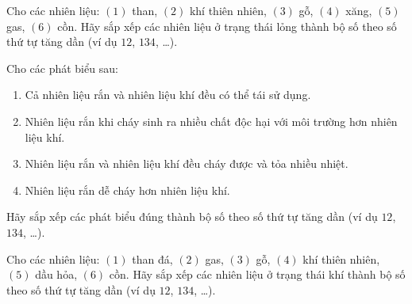 \documentclass[Main.tex]{subfiles}
\begin{document}
\begin{ex}%
	Cho các nhiên liệu: $(1)$ than, $(2)$ khí thiên nhiên, $(3)$ gỗ, $(4)$ xăng, $(5)$ gas, $(6)$ cồn. Hãy sắp xếp các nhiên liệu ở trạng thái lỏng thành bộ số theo số thứ tự tăng dần (ví dụ $12$, $134$, …).
\end{ex}

\begin{ex}%
	Cho các phát biểu sau:
	\begin{enumerate}[(1)]
		\item Cả nhiên liệu rắn và nhiên liệu khí đều có thể tái sử dụng.
		\item Nhiên liệu rắn khi cháy sinh ra nhiều chất độc hại với môi trường hơn nhiên liệu khí.
		\item Nhiên liệu rắn và nhiên liệu khí đều cháy được và tỏa nhiều nhiệt.
		\item Nhiên liệu rắn dễ cháy hơn nhiên liệu khí.
	\end{enumerate}
	Hãy sắp xếp các phát biểu đúng thành bộ số theo số thứ tự tăng dần (ví dụ $12$, $134$, …).
\end{ex}

\begin{ex}%
	Cho các nhiên liệu: $(1)$ than đá, $(2)$ gas, $(3)$ gỗ, $(4)$ khí thiên nhiên, $(5)$ dầu hỏa, $(6)$ cồn. Hãy sắp xếp các nhiên liệu ở trạng thái khí thành bộ số theo số thứ tự tăng dần (ví dụ $12$, $134$, …).
\end{ex}
\end{document}
